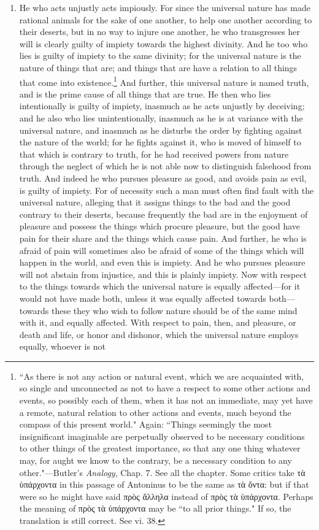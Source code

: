 \begin{enumerate}
\item He who acts unjustly acts impiously. For since the universal nature has made rational animals for the sake of one another, to help one another according to their deserts, but in no way to injure one another, he who transgresses her will is clearly guilty of impiety towards the highest divinity. And he too who lies is guilty of impiety to the same divinity; for the universal nature is the nature of things that are; and things that are have a relation to all things that come into existence.\footnote{``As there is not any action or natural event, which we are acquainted with, so single and unconnected as not to have a respect to some other actions and events, so possibly each of them, when it has not an immediate, may yet have a remote, natural relation to other actions and events, much beyond the compass of this present world." Again: ``Things seemingly the most insignificant imaginable are perpetually observed to be necessary conditions to other things of the greatest importance, so that any one thing whatever may, for aught we know to the contrary, be a necessary condition to any other."—Butler's \textit{Analogy}, Chap. 7. See all the chapter. Some critics take \textgreek{τὰ ὑπάρχοντα} in this passage of Antoninus to be the same as \textgreek{τὰ ὄντα}: but if that were so he might have said \textgreek{πρὸς ἄλληλα} instead of \textgreek{πρὸς τὰ ὑπάρχοντα}. Perhaps the meaning of \textgreek{πρὸς τὰ ὑπάρχοντα} may be ``to all prior things." If so, the translation is still correct. See vi. 38.} And further, this universal nature is named truth, and is the prime cause of all things that are true. He then who lies intentionally is guilty of impiety, inasmuch as he acts unjustly by deceiving; and he also who lies unintentionally, inasmuch as he is at variance with the universal nature, and inasmuch as he disturbs the order by fighting against the nature of the world; for he fights against it, who is moved of himself to that which is contrary to truth, for he had received powers from nature through the neglect of which he is not able now to distinguish falsehood from truth. And indeed he who pursues pleasure as good, and avoids pain as evil, is guilty of impiety. For of necessity such a man must often find fault with the universal nature, alleging that it assigns things to the bad and the good contrary to their deserts, because frequently the bad are in the enjoyment of pleasure and possess the things which procure pleasure, but the good have pain for their share and the things which cause pain. And further, he who is afraid of pain will sometimes also be afraid of some of the things which will happen in the world, and even this is impiety. And he who pursues pleasure will not abstain from injustice, and this is plainly impiety. Now with respect to the things towards which the universal nature is equally affected—for it would not have made both, unless it was equally affected towards both—towards these they who wish to follow nature should be of the same mind with it, and equally affected. With respect to pain, then, and pleasure, or death and life, or honor and dishonor, which the universal nature employs equally, whoever is not 
\end{enumerate}

